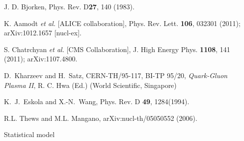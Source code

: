 \documentclass[aps,prc,preprint,superscriptaddress,showpacs,showkeys]{revtex4-1}
\begin{document}
\begin{thebibliography}{100}
 J. D. Bjorken, Phys. Rev. D{\bf 27}, 140 (1983). 

 K. Aamodt {\it et al.} [ALICE collaboration], Phys. Rev. Lett. {\bf 106}, 032301 (2011);
          arXiv:1012.1657 [nucl-ex].

 S. Chatrchyan {\it et al.} [CMS Collaboration], J. High Energy Phys. {\bf 1108}, 141 (2011);
       arXiv:1107.4800.  

D.~Kharzeev and H.~Satz, CERN-TH/95-117, BI-TP 95/20,
         {\it Quark-Gluon Plasma II}, R. C. Hwa (Ed.) (World Scientific, Singapore)

K.~J.~Eskola and X.-N.~Wang, Phys. Rev. D {\bf 49}, 1284(1994).
 
 R.L. Thews and M.L. Mangano, arXiv:nucl-th/05050552 (2006).

  Statistical model

\end{thebibliography}
\end{document}
